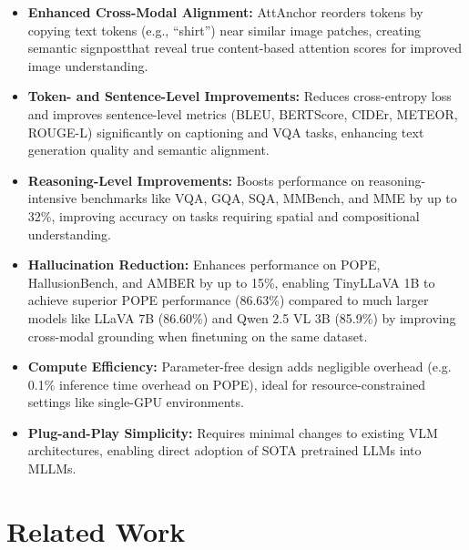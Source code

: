 \documentclass[11pt]{article}
\begin{document}
\begin{itemize}

\item \textbf{Enhanced Cross-Modal Alignment:} AttAnchor reorders tokens by copying text tokens (e.g., ``shirt'') near similar image patches, creating semantic signpostthat reveal true content-based attention scores for improved image understanding. 
\item \textbf{Token- and Sentence-Level Improvements:} Reduces cross-entropy loss and improves sentence-level metrics (BLEU, BERTScore, CIDEr, METEOR, ROUGE-L) significantly on captioning and VQA tasks, enhancing text generation quality and semantic alignment.
\item \textbf{Reasoning-Level Improvements:} Boosts performance on reasoning-intensive benchmarks like VQA, GQA, SQA, MMBench, and MME by up to 32\%, improving accuracy on tasks requiring spatial and compositional understanding.
\item \textbf{Hallucination Reduction:} Enhances performance on POPE, HallusionBench, and AMBER by up to 15\%, enabling TinyLLaVA 1B to achieve superior POPE performance (86.63\%) compared to much larger models like LLaVA 7B (86.60\%) and Qwen 2.5 VL 3B (85.9\%) by improving cross-modal grounding when finetuning on the same dataset.
\item \textbf{Compute Efficiency:} Parameter-free design adds negligible overhead (e.g. 0.1\% inference time overhead on POPE), ideal for resource-constrained settings like single-GPU environments.
\item \textbf{Plug-and-Play Simplicity:} Requires minimal changes to existing VLM architectures, enabling direct adoption of SOTA pretrained LLMs into MLLMs.
\end{itemize}

\vspace{-0.01cm}
\section{Related Work}
\label{sec:related-work}
\end{document}
